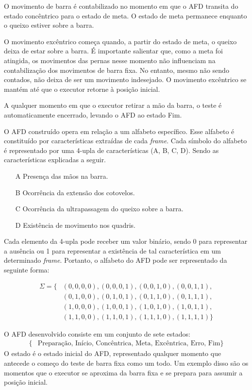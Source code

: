 O movimento de barra é contabilizado no momento em que o \ac{AFD} transita do estado concêntrico para o estado de meta. O estado de meta permanece enquanto o queixo estiver sobre a barra.

O movimento excêntrico começa quando, a partir do estado de meta, o queixo deixa de estar sobre a barra. É importante salientar que, como a meta foi atingida, os movimentos das pernas nesse momento não influenciam na contabilização dos movimentos de barra fixa. No entanto, mesmo não sendo contados, não deixa de ser um movimento indesejado. O movimento excêntrico se mantém até que o executor retorne à posição inicial.

A qualquer momento em que o executor retirar a mão da barra, o teste é automaticamente encerrado, levando o \ac{AFD} ao estado Fim.

O \ac{AFD} construído opera em relação a um alfabeto específico. Esse alfabeto é constituído por características extraídas de cada \textit{frame}. Cada símbolo do alfabeto é representado por uma 4-upla de características (A, B, C, D). Sendo as características explicadas a seguir.

\begin{itemize}
    \item[A] Presença das mãos na barra.
    \item[B] Ocorrência da extensão dos cotovelos.
    \item[C] Ocorrência da ultrapassagem do queixo sobre a barra.
    \item[D] Existência de movimento nos quadris.
\end{itemize} 

Cada elemento da 4-upla pode receber um valor binário, sendo 0 para representar a ausência ou 1 para representar a existência de tal característica em um determinado \textit{frame}. Portanto, o alfabeto do \ac{AFD} pode ser representado da seguinte forma:

\[
\begin{aligned}
\Sigma = \{ &(0, 0, 0, 0), (0, 0, 0, 1), (0, 0, 1, 0), (0, 0, 1, 1), \\
            &(0, 1, 0, 0), (0, 1, 0, 1), (0, 1, 1, 0), (0, 1, 1, 1), \\
            &(1, 0, 0, 0), (1, 0, 0, 1), (1, 0, 1, 0), (1, 0, 1, 1), \\
            &(1, 1, 0, 0), (1, 1, 0, 1), (1, 1, 1, 0), (1, 1, 1, 1) \}
\end{aligned}
\]

O \ac{AFD} desenvolvido consiste em um conjunto de sete estados:
\[
\begin{aligned}
\{ &\text{Preparação, Início, Concêntrica, Meta, Excêntrica, Erro, Fim} \}
\end{aligned}
\]
O estado  é o estado inicial do \ac{AFD}, representado qualquer momento que antecede o começo do teste de barra fixa como um todo. Um exemplo disso são os momentos que o executor se aproxima da barra fixa e se prepara para assumir a posição inicial.

